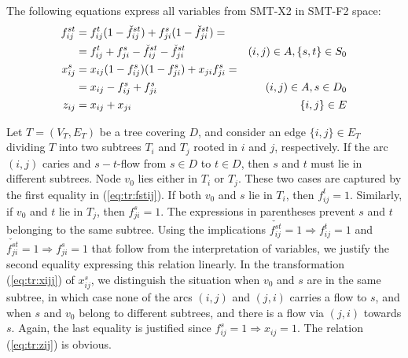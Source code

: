 The following equations express all variables from SMT-X2 in SMT-F2 space:
\begin{subequations}
\begin{align}
\notag\label{eq:tr:fstij}f^{st}_{ij}&=f^t_{ij}(1-\check{f}^{st}_{ij})+f^{s}_{ji}(1-\check{f}^{st}_{ji})= \\
&=  f^t_{ij}+f^s_{ji} - \check{f}^{st}_{ij} - \check{f}^{st}_{ji}& (i,j)\in A, \{s,t\}\in S_0\\
\notag\label{eq:tr:xijj}x^s_{ij}&=x_{ij}(1-f^{s}_{ij})(1-f^{s}_{ji})+x_{ji}f^{s}_{ji}=
\\&= x_{ij}-f^s_{ij} + f^{s}_{ji} & (i,j)\in A, s\in D_0\\
\label{eq:tr:zij}z_{ij}&=x_{ij}+x_{ji}& \{i,j\}\in E
\end{align}
\end{subequations}

Let $T=(V_T,E_T)$ be a tree covering $D$, and consider an edge $\{i,j\}\in E_T$ dividing $T$ into two subtrees $T_i$ and $T_j$ rooted in $i$ and $j$, respectively.  If the arc $(i,j)$ caries and $s-t$-flow from $s\in D$ to $t\in D$, then $s$ and $t$ must lie in different subtrees. Node $v_0$ lies either in $T_i$ or $T_j$.
These two cases are captured by the first equality in (\ref{eq:tr:fstij}). If both $v_0$ and $s$ lie in $T_i$, then $f_{ij}^t=1$. Similarly, if $v_0$ and $t$ lie in $T_j$, then $f_{ji}^s=1$. The expressions in parentheses prevent $s$ and $t$ belonging to the same subtree. Using the implications $\check{f^{st}_{ij}}=1\Rightarrow f_{ij}^t=1$ and $\check{f^{st}_{ji}}=1\Rightarrow f_{ji}^s=1$ that follow from the interpretation of variables, we justify the second equality expressing this relation linearly.
In the transformation (\ref{eq:tr:xijj}) of $x_{ij}^s$, we distinguish the situation when $v_0$ and $s$ are in the same subtree, in which case none of the arcs $(i,j)$ and $(j,i)$ carries a flow to $s$, and when $s$ and $v_0$ belong to different subtrees, and there is a flow via $(j,i)$ towards $s$. Again, the last equality is justified since $f_{ij}^s=1\Rightarrow x_{ij}=1$. The relation (\ref{eq:tr:zij}) is obvious.

